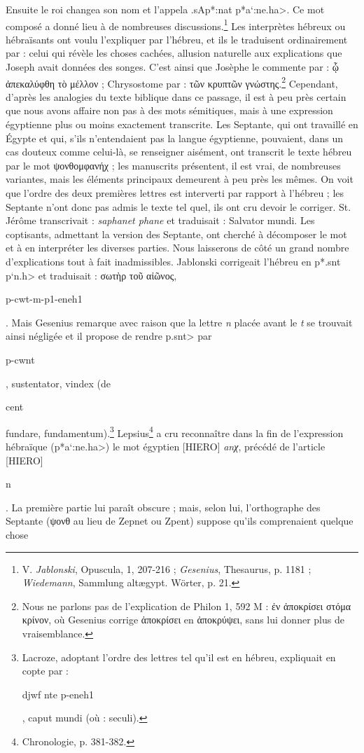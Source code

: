 \documentclass[a4paper, 11pt, oneside]{article}
\begin{document}
Ensuite le roi changea son nom et l'appela \foreignlanguage{hebrew}{\<.sAp*:nat p*a`:ne.ha>}. Ce mot composé a donné lieu à de nombreuses discussions.\footnote{V. \emph{Jablonski}, Opuscula, 1, 207-216 ; \emph{Gesenius}, Thesaurus, p. 1181 ; \emph{Wiedemann}, Sammlung altægypt. Wörter, p. 21.} Les interprètes hébreux ou hébraïsants ont voulu l'expliquer par l'hébreu, et ils le traduisent ordinairement par : celui qui révèle les choses cachées, allusion naturelle aux explications que Joseph avait données des songes. C'est ainsi que Josèphe le commente par : ᾧ ἀπεκαλύφθη τὸ μέλλον ; Chrysostome par : τῶν κρυπτῶν γνώστης.\footnote{Nous ne parlons pas de l'explication de Philon 1, 592 M : ἐν ἀποκρίσει στόμα κρίνον, où Gesenius corrige ἀποκρίσει en ἀποκρύψει, sans lui donner plus de vraisemblance.} Cependant, d'après les analogies du texte biblique dans ce passage, il est à peu près certain que nous avons affaire non pas à des mots sémitiques, mais à une expression égyptienne plus ou moins exactement transcrite. Les Septante, qui ont travaillé en Égypte et qui, s'ils n'entendaient pas la langue égyptienne, pouvaient, dans un cas douteux comme celui-là, se renseigner aisément, ont transcrit le texte hébreu par le mot ψονθομφανήχ ; les manuscrits présentent, il est vrai, de nombreuses variantes, mais les éléments principaux demeurent à peu près les mêmes. On voit que l'ordre des deux premières lettres est interverti par rapport à l'hébreu ; les Septante n'ont donc pas admis le texte tel quel, ils ont cru devoir le corriger. St. Jérôme transcrivait : \emph{saphanet phane} et traduisait : Salvator mundi. Les coptisants, admettant la version des Septante, ont cherché à décomposer le mot et à en interpréter les diverses parties. Nous laisserons de côté un grand nombre d'explications tout à fait inadmissibles. Jablonski corrigeait l'hébreu en \foreignlanguage{hebrew}{\<p*.snt p`n.h>} et traduisait : σωτὴρ τοῦ αἰῶνος, \begin{coptic}p-cwt-m-p1-eneh1\end{coptic}. Mais Gesenius remarque avec raison que la lettre \emph{n} placée avant le \emph{t} se trouvait ainsi négligée et il propose de rendre \foreignlanguage{hebrew}{\<p.snt>} par \begin{coptic}p-cwnt\end{coptic}, sustentator, vindex (de \begin{coptic}cent\end{coptic} fundare, fundamentum).\footnote{Lacroze, adoptant l'ordre des lettres tel qu'il est en hébreu, expliquait en copte par : \begin{coptic}djwf nte p-eneh1\end{coptic}, caput mundi (où : seculi).} Lepsius\footnote{Chronologie, p. 381-382.} a cru reconnaître dans la fin de l'expression hébraïque (\foreignlanguage{hebrew}{\<p*a`:ne.ha>}) le mot égyptien [HIERO] \emph{anχ}, précédé de l'article [HIERO] \begin{coptic}n\end{coptic}. La première partie lui paraît obscure ; mais, selon lui, l'orthographe des Septante (ψονθ au lieu de Zepnet ou Zpent) suppose qu'ils comprenaient quelque chose 
\end{document}
